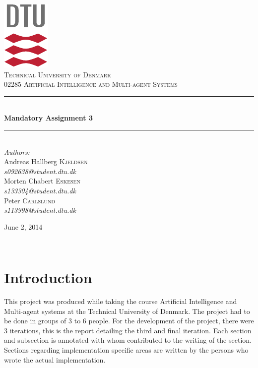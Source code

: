 \documentclass[11pt]{article}
\newcommand{\HRule}{\rule{\linewidth}{0.5mm}}
\begin{document}
\begin{titlepage}
\begin{center}

\includegraphics[scale=2.0]{../GFX/dtu_logo.pdf}\\[1cm]

\textsc{\LARGE Technical University of Denmark}\\[1.5cm]

\textsc{\Large 02285 Artificial Intelligence and Multi-agent Systems}\\[0.5cm]

\HRule \\[0.4cm]
{\huge \bfseries Mandatory Assignment 3}\\[0.1cm]
\HRule \\[1.5cm]

\large
\emph{Authors:}
\\[10pt]
Andreas Hallberg \textsc{Kjeldsen}\\
\emph{s092638@student.dtu.dk}
\\[10pt]
Morten Chabert \textsc{Eskesen}\\
\emph{s133304@student.dtu.dk}
\\[10pt]
Peter \textsc{Carlslund}\\
\emph{s113998@student.dtu.dk}

\vfill

{\large June 2, 2014}

\end{center}
\end{titlepage}

${}$
\vspace{-.55cm}

\section{Introduction}
This project was produced while taking the course Artificial Intelligence and Multi-agent systems at the Technical University of Denmark. The project had to be done in groups of 3 to 6 people. For the development of the project, there were 3 iterations, this is the report detailing the third and final iteration. Each section and subsection is annotated with whom contributed to the writing of the section. Sections regarding implementation specific areas are written by the persons who wrote the actual implementation.
\end{document}
